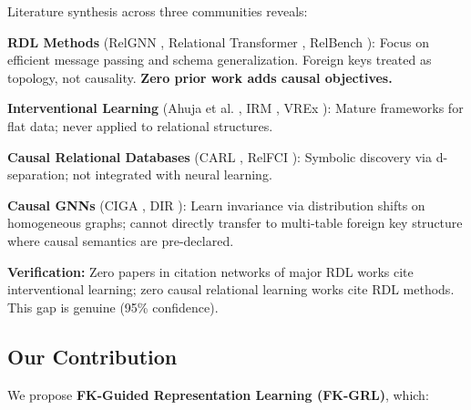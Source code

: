 \documentclass[11pt,letterpaper]{article}
\begin{document}
Literature synthesis across three communities reveals:

\textbf{RDL Methods} (RelGNN \cite{Chen2025}, Relational Transformer \cite{Ranjan2025}, RelBench \cite{Gu2026}): Focus on efficient message passing and schema generalization. Foreign keys treated as topology, not causality. \textbf{Zero prior work adds causal objectives.}

\textbf{Interventional Learning} (Ahuja et al. \cite{Ahuja2023}, IRM \cite{Arjovsky2019}, VREx \cite{Krueger2021}): Mature frameworks for flat data; never applied to relational structures.

\textbf{Causal Relational Databases} (CARL \cite{Salimi2020}, RelFCI \cite{Negro2025}): Symbolic discovery via d-separation; not integrated with neural learning.

\textbf{Causal GNNs} (CIGA \cite{Zhu2022}, DIR \cite{Wu2022}): Learn invariance via distribution shifts on homogeneous graphs; cannot directly transfer to multi-table foreign key structure where causal semantics are pre-declared.

\textbf{Verification:} Zero papers in citation networks of major RDL works cite interventional learning; zero causal relational learning works cite RDL methods. This gap is genuine (95\% confidence).

\subsection{Our Contribution}

We propose \textbf{FK-Guided Representation Learning (FK-GRL)}, which:
\end{document}
